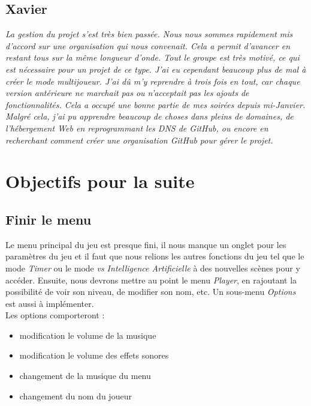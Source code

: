 \documentclass[12pt,a4paper]{article}
\newcommand{\AI}{Intelligence Artificielle}
\begin{document}
    \subsection{Xavier}
        \textit{La gestion du projet s'est très bien passée. Nous nous sommes
        rapidement mis d'accord sur une organisation qui nous convenait. Cela a
        permit d'avancer en restant tous sur la même longueur d'onde. Tout le
        groupe est très motivé, ce qui est nécessaire pour un projet de ce type.
        J'ai eu cependant beaucoup plus de mal à créer le mode multijoueur. J'ai
        dû m'y reprendre à trois fois en tout, car chaque version antérieure
        ne marchait pas ou n'acceptait pas les ajouts de fonctionnalités. Cela a
        occupé une bonne partie de mes soirées depuis mi-Janvier. Malgré cela, 
        j'ai pu apprendre beaucoup de choses dans pleins de domaines, de
        l'hébergement Web en reprogrammant les \textit{DNS} de \textsl{GitHub}, 
        ou encore en recherchant comment créer une organisation \textsl{GitHub} 
        pour gérer le projet.}\\[1cm]


\section{Objectifs pour la suite}
    \subsection{Finir le menu}
        Le menu principal du jeu est presque fini, il nous manque un onglet 
        pour les paramètres du jeu et il faut que nous relions les autres
        fonctions du jeu tel que le mode \textit{Timer} ou le mode \textit{vs \AI}
        à des nouvelles scènes pour y accéder. Ensuite, nous devrons mettre 
        au point le menu \textit{Player}, en rajoutant la possibilité de 
        voir son niveau, de modifier son nom, etc. Un sous-menu \textit{Options}
        est aussi à implémenter.\\
        Les options comporteront :
        \begin{itemize}
            \item modification le volume de la musique
            \item modification le volume des effets sonores
            \item changement de la musique du menu
            \item changement du nom du joueur
        \end{itemize}
\end{document}
